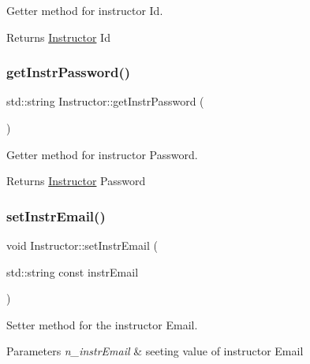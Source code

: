 Getter method for instructor Id. 

\begin{DoxyReturn}{Returns}
\hyperlink{class_instructor}{Instructor} Id 
\end{DoxyReturn}
\mbox{\label{class_instructor_a1e57077ab77d5ca2ea2d853f7a79b279}} 
\subsubsection{\texorpdfstring{get\+Instr\+Password()}{getInstrPassword()}}
{\footnotesize\ttfamily std\+::string Instructor\+::get\+Instr\+Password (\begin{DoxyParamCaption}{ }\end{DoxyParamCaption})}



Getter method for instructor Password. 

\begin{DoxyReturn}{Returns}
\hyperlink{class_instructor}{Instructor} Password 
\end{DoxyReturn}
\mbox{\label{class_instructor_a99b99002bf23dba78dc65043c7d87c5d}} 
\subsubsection{\texorpdfstring{set\+Instr\+Email()}{setInstrEmail()}}
{\footnotesize\ttfamily void Instructor\+::set\+Instr\+Email (\begin{DoxyParamCaption}\item[{std\+::string const}]{instr\+Email }\end{DoxyParamCaption})}



Setter method for the instructor Email. 


\begin{DoxyParams}{Parameters}
{\em n\+\_\+instr\+Email} & seeting value of instructor Email \\
\hline
\end{DoxyParams}
\mbox{\label{class_instructor_a91ec2cfd9d228fbed7a6019f4e81eb5c}} 
